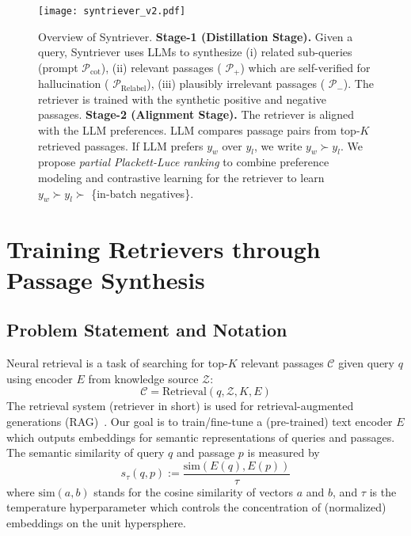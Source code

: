 \begin{figure*}[t!]
    \centering
    \texttt{[image: syntriever\_v2.pdf]}
    \caption{Overview of Syntriever. \textbf{Stage-1 (Distillation Stage).} Given a query, Syntriever uses LLMs to synthesize (i) related sub-queries (prompt $\mathcal P_\text{cot}$), (ii) relevant passages  ( $\mathcal P_+$) which are self-verified for hallucination ( $\mathcal P_\text{Relabel}$), (iii) plausibly irrelevant passages ( $\mathcal P_-$). The retriever is trained with the synthetic positive and negative passages. \textbf{Stage-2 (Alignment Stage).} The retriever is aligned with the LLM preferences. LLM compares passage pairs from top-$K$ retrieved passages. If LLM prefers $y_w$ over $y_l$, we write $y_w\succ y_l$. We propose \emph{partial Plackett-Luce ranking} to combine preference modeling and contrastive learning for the retriever to learn $y_w\succ y_l \succ$ \{in-batch negatives\}.
    }
    \label{fig:model}
\end{figure*}

\section{Training Retrievers through Passage Synthesis}

\subsection{Problem Statement and Notation}

Neural retrieval is a task of searching for top-$K$ relevant passages $\mathcal{C}$ given query $q$ using encoder $E$ from knowledge source $\mathcal{Z}$: 
\begin{equation}
    \mathcal{C} = \mathrm{Retrieval}(q, \mathcal{Z}, K, E)
\end{equation}
The retrieval system (retriever in short) is used for retrieval-augmented generations (RAG)~\cite{lewis2020retrieval,guu2020retrieval}.
Our goal is to train/fine-tune a (pre-trained) text encoder $E$ which outputs embeddings for semantic representations of queries and passages.
The semantic similarity of query $q$ and passage $p$ is measured by \[
s_\tau(q,p) := \frac{\text{sim}(E(q),E(p))}{\tau}
\]
where $\text{sim}(a,b)$ stands for the cosine similarity of vectors $a$ and $b$, and $\tau$ is the temperature hyperparameter which controls the concentration of (normalized) embeddings on the unit hypersphere.

